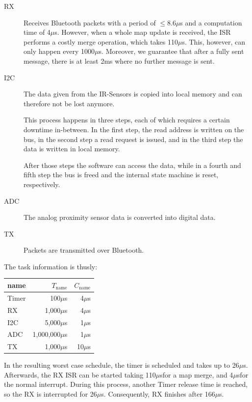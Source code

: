 \documentclass[a4paper,parskip,headheight=38pt]{scrartcl} %
\newcommand{\mics}{$\mu$s}
\begin{document}
{\begin{description}
        \item[RX] Receives Bluetooth packets with a period of $\leq$8.6\mics
        and a computation time of 4\mics. However, when a whole map update is
        received, the ISR performs a costly merge operation, which takes
        110\mics. This, however, can only happen every 1000\mics. Moreover, we
        guarantee that after a fully sent message, there is at least 2ms where
        no further message is sent.
        \item[I2C] The data given from the IR-Sensors is copied into local
        memory and can therefore not be lost anymore.

        This process happens in three steps, each of which requires a
        certain downtime in-between. In the first step, the read address is
        written on the bus,
        in the second step a read request is issued, and in the third step the
        data is written in local memory. 

        After those steps the software can access the data, while in a fourth
        and fifth step the bus is freed and the internal state machine is reset,
        respectively.
        \item[ADC] The analog proximity sensor data is converted into digital
        data.
        \item[TX] Packets are transmitted over Bluetooth.
    \end{description}
    The task information is thusly:
    \begin{center}
    \begin{tabular}{l | r | r}
        name & $T_{\text{name}}$ & $C_\text{name}$ \\
        \hline
        Timer    & 100\mics       & 4\mics \\
        RX       & 1,000\mics     & 4\mics \\
        I2C      & 5,000\mics     & 1\mics \\
        ADC      & 1,000,000\mics & 1\mics \\
        TX       & 1,000\mics     & 10\mics \\
    \end{tabular}
    \end{center}
    In the resulting worst case schedule, the timer is scheduled and takes up to
    26\mics. Afterwards, the RX ISR can be started taking 110\mics for a map
    merge, and 4\mics for the normal interrupt. During this process, another
    Timer release time is reached, so the RX is interrupted for 26\mics.
    Consequently, RX finishes after 166\mics.

}
\end{document}
